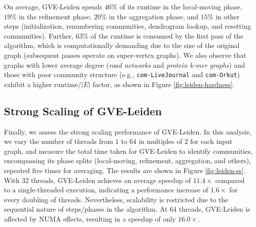 On average, GVE-Leiden spends $46\%$ of its runtime in the local-moving phase, $19\%$ in the refinement phase, $20\%$ in the aggregation phase, and $15\%$ in other steps (initialization, renumbering communities, dendrogram lookup, and resetting communities). Further, $63\%$ of the runtime is consumed by the first pass of the algorithm, which is computationally demanding due to the size of the original graph (subsequent passes operate on super-vertex graphs). We also observe that graphs with lower average degree (\textit{road networks} and \textit{protein k-mer graphs}) and those with poor community structure (e.g., \verb|com-LiveJournal| and \verb|com-Orkut|) exhibit a higher $\text{runtime}/|E|$ factor, as shown in Figure \ref{fig:leiden-hardness}.




\subsection{Strong Scaling of GVE-Leiden}

Finally, we assess the strong scaling performance of GVE-Leiden. In this analysis, we vary the number of threads from $1$ to $64$ in multiples of $2$ for each input graph, and measure the total time taken for GVE-Leiden to identify communities, encompassing its phase splits (local-moving, refinement, aggregation, and others), repeated five times for averaging. The results are shown in Figure \ref{fig:leiden-ss}. With 32 threads, GVE-Leiden achieves an average speedup of $11.4\times$ compared to a single-threaded execution, indicating a performance increase of $1.6\times$ for every doubling of threads. Nevertheless, scalability is restricted due to the sequential nature of steps/phases in the algorithm. At 64 threads, GVE-Leiden is affected by NUMA effects, resulting in a speedup of only $16.0\times$.
